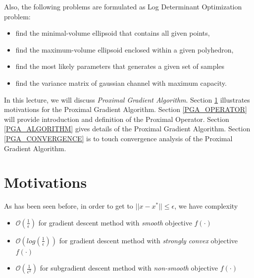 \documentclass[12pt]{report}
\begin{document}
Also, the following problems are formulated as Log Determinant Optimization
problem:
\begin{itemize}
    \item find the minimal-volume ellipsoid that contains all given points, 
    \item find the maximum-volume ellipsoid enclosed within a given polyhedron, 
    \item find the most likely parameters that generates a given set of samples
    \item find the variance matrix of gaussian channel with maximum capacity.
\end{itemize}
In this lecture, we will discuss {\it Proximal Gradient Algorithm}. 
Section \ref{PGA_MOTIVATION} illustrates motivations for the Proximal Gradient Algorithm. 
Section \ref{PGA_OPERATOR} will provide introduction and definition of
the Proximal Operator. 
Section \ref{PGA_ALGORITHM} gives details of the Proximal Gradient Algorithm. 
Section \ref{PGA_CONVERGENCE} is to touch convergence analysis of the Proximal
Gradient Algorithm.

\section{Motivations} \label{PGA_MOTIVATION}
As has been seen before, in order to get to $|| x - x^* || \leq \epsilon$, we
have complexity
\begin{itemize}
    \item $\mathcal{O}(\frac{1}{\epsilon})$ for gradient descent method with
        {\it smooth} objective $f(\cdot)$

    \item $\mathcal{O}(log(\frac{1}{\epsilon}))$ for gradient descent method
        with {\it strongly convex} objective $f(\cdot)$
    \item $\mathcal{O}(\frac{1}{\epsilon^2})$ for subgradient descent method
        with {\it non-smooth} objective $f(\cdot)$
\end{itemize}
\end{document}
